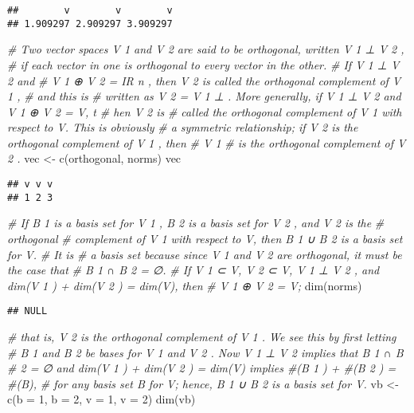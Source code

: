 \documentclass[
]{article}
\newenvironment{Shaded}{\begin{snugshade}}{\end{snugshade}}
\newcommand{\AttributeTok}[1]{\textcolor[rgb]{0.77,0.63,0.00}{#1}}
\newcommand{\CommentTok}[1]{\textcolor[rgb]{0.56,0.35,0.01}{\textit{#1}}}
\newcommand{\DecValTok}[1]{\textcolor[rgb]{0.00,0.00,0.81}{#1}}
\newcommand{\FunctionTok}[1]{\textcolor[rgb]{0.00,0.00,0.00}{#1}}
\newcommand{\NormalTok}[1]{#1}
\newcommand{\OtherTok}[1]{\textcolor[rgb]{0.56,0.35,0.01}{#1}}
\begin{document}
\begin{verbatim}
##        v        v        v 
## 1.909297 2.909297 3.909297
\end{verbatim}

\begin{Shaded}
\begin{Highlighting}[]
\CommentTok{\# Two vector spaces V 1 and V 2 are said to be orthogonal, written V 1 ⊥ V 2 ,}
\CommentTok{\# if each vector in one is orthogonal to every vector in the other. }
\CommentTok{\# If V 1 ⊥ V 2 and}
\CommentTok{\# V 1 ⊕ V 2 = IR n , then V 2 is called the orthogonal complement of V 1 , }
\CommentTok{\# and this is}
\CommentTok{\# written as V 2 = V 1 ⊥ . More generally, if V 1 ⊥ V 2 and V 1 ⊕ V 2 = V, t}
\CommentTok{\# hen V 2 is}
\CommentTok{\# called the orthogonal complement of V 1 with respect to V. This is obviously}
\CommentTok{\# a symmetric relationship; if V 2 is the orthogonal complement of V 1 , then }
\CommentTok{\# V 1}
\CommentTok{\# is the orthogonal complement of V 2 .}
\NormalTok{vec }\OtherTok{\textless{}{-}} \FunctionTok{c}\NormalTok{(orthogonal, norms)}
\NormalTok{vec }
\end{Highlighting}
\end{Shaded}

\begin{verbatim}
## v v v 
## 1 2 3
\end{verbatim}

\begin{Shaded}
\begin{Highlighting}[]
\CommentTok{\# If B 1 is a basis set for V 1 , B 2 is a basis set for V 2 , and V 2 is the }
\CommentTok{\# orthogonal}
\CommentTok{\# complement of V 1 with respect to V, then B 1 ∪ B 2 is a basis set for V. }
\CommentTok{\# It is}
\CommentTok{\# a basis set because since V 1 and V 2 are orthogonal, it must be the case that}
\CommentTok{\# B 1 ∩ B 2 = ∅.}
\CommentTok{\# If V 1 ⊂ V, V 2 ⊂ V, V 1 ⊥ V 2 , and dim(V 1 ) + dim(V 2 ) = dim(V), then}
\CommentTok{\# V 1 ⊕ V 2 = V;}
\FunctionTok{dim}\NormalTok{(norms) }
\end{Highlighting}
\end{Shaded}

\begin{verbatim}
## NULL
\end{verbatim}

\begin{Shaded}
\begin{Highlighting}[]
\CommentTok{\# that is, V 2 is the orthogonal complement of V 1 . We see this by ﬁrst letting }
\CommentTok{\# B 1 and B 2 be bases for V 1 and V 2 . Now V 1 ⊥ V 2 implies that B 1 ∩ B }
\CommentTok{\# 2 = ∅ and dim(V 1 ) + dim(V 2 ) = dim(V) implies \#(B 1 ) + \#(B 2 ) = \#(B), }
\CommentTok{\# for any basis set B for V; hence, B 1 ∪ B 2 is a basis set for V.}
\NormalTok{vb }\OtherTok{\textless{}{-}} \FunctionTok{c}\NormalTok{(}\AttributeTok{b =} \DecValTok{1}\NormalTok{, }\AttributeTok{b =} \DecValTok{2}\NormalTok{, }\AttributeTok{v =} \DecValTok{1}\NormalTok{, }\AttributeTok{v =} \DecValTok{2}\NormalTok{)}
\FunctionTok{dim}\NormalTok{(vb)}
\end{Highlighting}
\end{Shaded}
\end{document}
